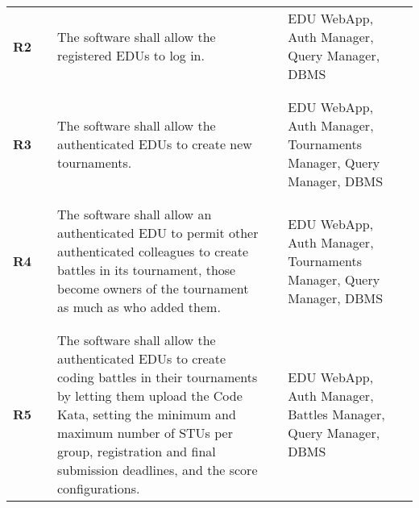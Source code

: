 \begin{longtable}[H]{l l p{6cm} l p{4cm} l}
    \textbf{R2}             & \vline & The software shall allow the registered EDUs to log in.                                                                                                                                                                                                                      & \vline &  EDU WebApp, Auth Manager, Query Manager, DBMS  \\          
                            &        &                                                                                                                                                                                                                                                                              &        &       \\\hline  & & \\ 
    \textbf{R3}             & \vline & The software shall allow the authenticated EDUs to create new tournaments.                                                                                                                                                                                                   & \vline &  EDU WebApp, Auth Manager, Tournaments Manager, Query Manager, DBMS \\          
                            &        &                                                                                                                                                                                                                                                                              &        &       \\\hline  & & \\ 
    \textbf{R4}             & \vline & The software shall allow an authenticated EDU to permit other authenticated colleagues to create battles in its tournament, those become owners of the tournament as much as who added them.                                                                                 & \vline &  EDU WebApp, Auth Manager, Tournaments Manager, Query Manager, DBMS \\          
                            &        &                                                                                                                                                                                                                                                                              &        &       \\\hline  & & \\ 
    \textbf{R5}             & \vline & The software shall allow the authenticated EDUs to create coding battles in their tournaments by letting them upload the Code Kata, setting the minimum and maximum number of STUs per group, registration and final submission deadlines, and the score configurations.     & \vline &  EDU WebApp, Auth Manager, Battles Manager, Query Manager, DBMS \\          

\end{longtable}
